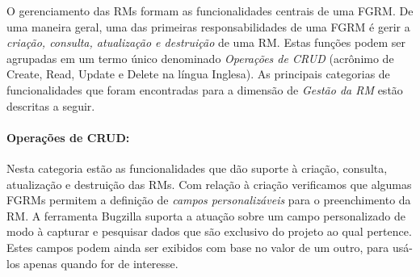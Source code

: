 \begin{table}[htpb]
\centering
{}
\caption{Frequência de cada categoria de funcionalidade no conjunto de cartões
	obtidos.}
\label{tab:freq_categorias_cartoes}
\end{table}

O gerenciamento das RMs formam as funcionalidades centrais de uma FGRM\@. De uma
maneira geral, uma das primeiras responsabilidades de uma FGRM é gerir a
\textit{criação, consulta, atualização e destruição} de uma RM\@. Estas funções
podem ser agrupadas em um termo único denominado \textit{Operações de CRUD}
(acrônimo de Create, Read, Update e Delete na língua Inglesa). As principais
categorias de funcionalidades que foram encontradas para a dimensão de
\textit{Gestão da RM} estão descritas a seguir.

\paragraph{Operações de CRUD:}
\label{par:operações_de_crud}

Nesta categoria estão as funcionalidades que dão suporte à criação,	consulta,
atualização e destruição das RMs. Com relação à criação verificamos que algumas
FGRMs permitem a definição de \textit{campos personalizáveis} para o
preenchimento da RM\@. A ferramenta Bugzilla suporta a atuação sobre um campo
personalizado de modo à capturar e pesquisar dados que são exclusivo do projeto
ao qual pertence. Estes campos podem ainda ser exibidos com base no valor de um
outro, para usá-los apenas quando for de interesse.

